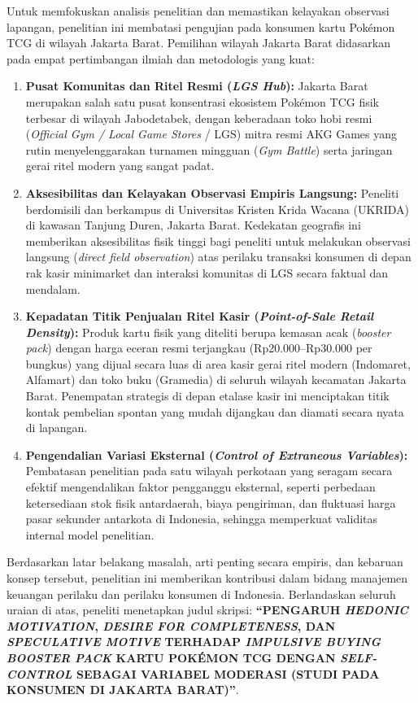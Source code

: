 \documentclass[12pt,a4paper]{article}
\numberwithin{equation}{section}
\numberwithin{table}{section}
\numberwithin{figure}{section}
\newcommand{\judulskripsi}{PENGARUH \emph{HEDONIC MOTIVATION}, \emph{DESIRE FOR COMPLETENESS}, DAN \emph{SPECULATIVE MOTIVE} TERHADAP \emph{IMPULSIVE BUYING} \emph{BOOSTER PACK} KARTU POK\'EMON TCG DENGAN \emph{SELF-CONTROL} SEBAGAI VARIABEL MODERASI (STUDI PADA KONSUMEN DI JAKARTA BARAT)}
\begin{document}
Untuk memfokuskan analisis penelitian dan memastikan kelayakan observasi lapangan, penelitian ini membatasi pengujian pada konsumen kartu Pok\'emon TCG di wilayah Jakarta Barat. Pemilihan wilayah Jakarta Barat didasarkan pada empat pertimbangan ilmiah dan metodologis yang kuat:
\begin{enumerate}
  \item \textbf{Pusat Komunitas dan Ritel Resmi (\emph{LGS Hub}):} Jakarta Barat merupakan salah satu pusat konsentrasi ekosistem Pok\'emon TCG fisik terbesar di wilayah Jabodetabek, dengan keberadaan toko hobi resmi (\emph{Official Gym / Local Game Stores} / LGS) mitra resmi AKG Games yang rutin menyelenggarakan turnamen mingguan (\emph{Gym Battle}) serta jaringan gerai ritel modern yang sangat padat.
  \item \textbf{Aksesibilitas dan Kelayakan Observasi Empiris Langsung:} Peneliti berdomisili dan berkampus di Universitas Kristen Krida Wacana (UKRIDA) di kawasan Tanjung Duren, Jakarta Barat. Kedekatan geografis ini memberikan aksesibilitas fisik tinggi bagi peneliti untuk melakukan observasi langsung (\emph{direct field observation}) atas perilaku transaksi konsumen di depan rak kasir minimarket dan interaksi komunitas di LGS secara faktual dan mendalam.
  \item \textbf{Kepadatan Titik Penjualan Ritel Kasir (\emph{Point-of-Sale Retail Density}):} Produk kartu fisik yang diteliti berupa kemasan acak (\emph{booster pack}) dengan harga eceran resmi terjangkau (Rp20.000--Rp30.000 per bungkus) yang dijual secara luas di area kasir gerai ritel modern (Indomaret, Alfamart) dan toko buku (Gramedia) di seluruh wilayah kecamatan Jakarta Barat. Penempatan strategis di depan etalase kasir ini menciptakan titik kontak pembelian spontan yang mudah dijangkau dan diamati secara nyata di lapangan.
  \item \textbf{Pengendalian Variasi Eksternal (\emph{Control of Extraneous Variables}):} Pembatasan penelitian pada satu wilayah perkotaan yang seragam secara efektif mengendalikan faktor pengganggu eksternal, seperti perbedaan ketersediaan stok fisik antardaerah, biaya pengiriman, dan fluktuasi harga pasar sekunder antarkota di Indonesia, sehingga memperkuat validitas internal model penelitian.
\end{enumerate}

Berdasarkan latar belakang masalah, arti penting secara empiris, dan kebaruan konsep tersebut, penelitian ini memberikan kontribusi dalam bidang manajemen keuangan perilaku dan perilaku konsumen di Indonesia. Berlandaskan seluruh uraian di atas, peneliti menetapkan judul skripsi: \textbf{``\judulskripsi''}.
\end{document}

